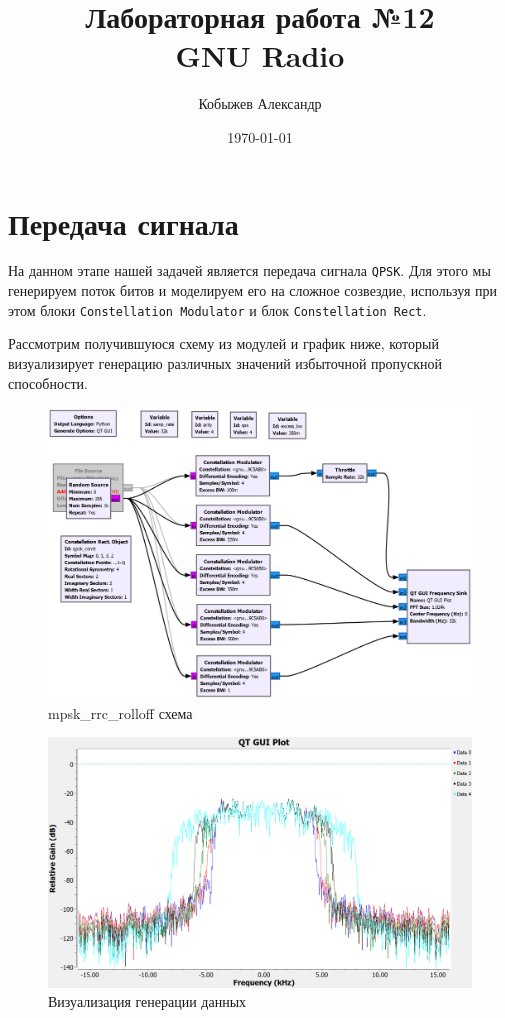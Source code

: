 \documentclass[a4paper,12pt]{report}
\title{Лабораторная работа №12\\GNU Radio}
\author{Кобыжев Александр}
\date{\today}
\begin{document}
\maketitle
\tableofcontents
\listoffigures

\maketitle

\chapter{Передача сигнала}

На данном этапе нашей задачей является передача сигнала \texttt{QPSK}. Для этого мы генерируем поток битов и моделируем его на сложное созвездие, используя при этом блоки \texttt{Constellation Modulator} и блок \texttt{Constellation Rect}. 

Рассмотрим получившуюся схему из модулей и график ниже, который визуализирует генерацию различных значений избыточной пропускной способности. 

\begin{figure}[H]
        \centering
        \includegraphics[width=1.0\textwidth]{lab12_fig1_1.png}
        \caption{mpsk\_rrc\_rolloff схема}
        \label{fig:lab11_fig3_1}
\end{figure}

\begin{figure}[H]
        \centering
        \includegraphics[width=1.0\textwidth]{lab12_fig1_2.png}
        \caption{Визуализация генерации данных}
        \label{fig:lab12_fig1_2}
\end{figure}
\end{document}
